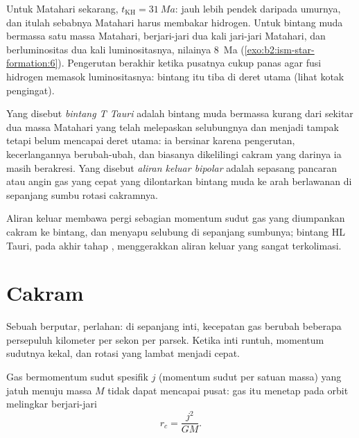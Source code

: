 Untuk Matahari sekarang, $t_{\mathrm{KH}} = \qty{31}{Ma}$: jauh lebih pendek daripada
umurnya, dan itulah sebabnya Matahari harus membakar hidrogen. Untuk bintang muda bermassa
satu massa Matahari, berjari-jari dua kali jari-jari Matahari, dan berluminositas dua kali
luminositasnya, nilainya \qty{8}{Ma}
(\cref{exo:b2:ism-star-formation:6}). Pengerutan berakhir ketika pusatnya cukup panas agar fusi hidrogen memasok luminositasnya: bintang itu tiba di deret utama (lihat kotak pengingat).

\begin{definition}\label{def:b2:ism-star-formation:t-tauri}
Yang disebut \emph{bintang T Tauri} adalah bintang muda bermassa
kurang dari sekitar dua massa Matahari yang telah melepaskan selubungnya dan menjadi
tampak tetapi belum mencapai deret utama: ia bersinar karena pengerutan, kecerlangannya
berubah-ubah, dan biasanya dikelilingi cakram yang darinya ia masih berakresi.
Yang disebut \emph{aliran keluar bipolar} adalah sepasang
pancaran atau angin gas yang cepat yang dilontarkan bintang muda ke arah berlawanan di
sepanjang sumbu rotasi cakramnya.
\end{definition}

Aliran keluar membawa pergi sebagian momentum sudut gas yang diumpankan cakram ke
bintang, dan menyapu selubung di sepanjang sumbunya; bintang HL Tauri, pada akhir
tahap , menggerakkan aliran keluar yang sangat terkolimasi.

\section{Cakram}

Sebuah  berputar, perlahan: di sepanjang inti, kecepatan gas berubah beberapa
persepuluh kilometer per sekon per parsek. Ketika inti runtuh, momentum sudutnya
kekal, dan rotasi yang lambat menjadi cepat.

\begin{proposition}\label{prop:b2:ism-star-formation:centrifugal}
Gas bermomentum sudut spesifik $j$ (momentum sudut per satuan massa)
yang jatuh menuju massa $M$ tidak dapat mencapai pusat: gas itu menetap pada orbit
melingkar berjari-jari
\[
  r_c = \frac{j^2}{G M}.
\]
\end{proposition}

